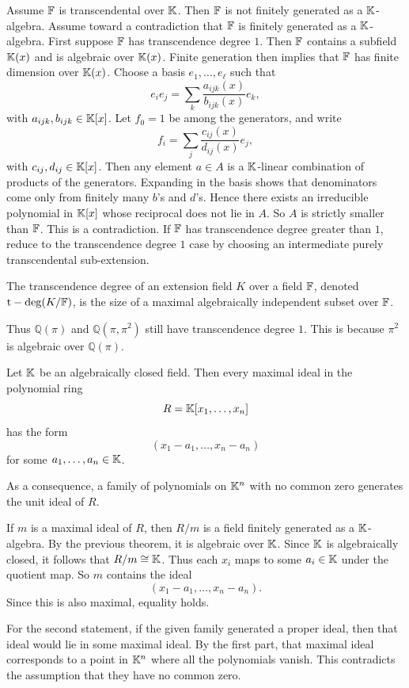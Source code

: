 \begin{theorem}{
    Assume $\mathbb{F}$ is transcendental over $\mathbb{K}$.
    Then $\mathbb{F}$ is not finitely generated as a $\mathbb{K}$-algebra.
}
Assume toward a contradiction that $\mathbb{F}$ is finitely generated as a $\mathbb{K}$-algebra.
First suppose $\mathbb{F}$ has transcendence degree $1$.
Then $\mathbb{F}$ contains a subfield $\mathbb{K}(x)$ and is algebraic over $\mathbb{K}(x)$.
Finite generation then implies that $\mathbb{F}$ has finite dimension over $\mathbb{K}(x)$.
Choose a basis $e_1,\ldots,e_\ell$ such that
\[
    e_{i}e_j = \sum_k \frac{a_{ijk}(x)}{b_{ijk}(x)}e_k,
\]
with $a_{ijk},b_{ijk}\in\mathbb{K}[x]$.
Let $f_0 = 1$ be among the generators, and write
\[
    f_i = \sum_j \frac{c_{ij}(x)}{d_{ij}(x)}e_j,
\]
with $c_{ij},d_{ij}\in\mathbb{K}[x]$.
Then any element $a\in A$ is a $\mathbb{K}$-linear combination of products of the generators.
Expanding in the basis shows that denominators come only from finitely many $b$'s and $d$'s.
Hence there exists an irreducible polynomial in $\mathbb{K}[x]$ whose reciprocal does not lie in $A$.
So $A$ is strictly smaller than $\mathbb{F}$.
This is a contradiction.
If $\mathbb{F}$ has transcendence degree greater than $1$, reduce to the transcendence degree $1$ case by choosing an intermediate purely transcendental sub-extension.
\end{theorem}

\begin{definition}
    The transcendence degree of an extension field $K$ over a field $\mathbb{F}$, denoted $\mathrm{t-deg}(K/\mathbb{F})$, is the size of a maximal algebraically independent subset over $\mathbb{F}$.
\end{definition}

Thus $\mathbb{Q}(\pi)$ and $\mathbb{Q}(\pi,\pi^2)$ still have transcendence degree $1$.
This is because $\pi^2$ is algebraic over $\mathbb{Q}(\pi)$.

\begin{theorem}{
    Let $\mathbb{K}$ be an algebraically closed field.
    Then every maximal ideal in the polynomial ring
    \[
        R = \mathbb{K}[x_1,\ldots,x_n]
    \]
    has the form
    \[
        (x_1-a_1,\ldots,x_n-a_n)
    \]
    for some $a_1,\ldots,a_n\in\mathbb{K}$.

    As a consequence, a family of polynomials on $\mathbb{K}^n$ with no common zero generates the unit ideal of $R$.
}
If $m$ is a maximal ideal of $R$, then $R/m$ is a field finitely generated as a $\mathbb{K}$-algebra.
By the previous theorem, it is algebraic over $\mathbb{K}$.
Since $\mathbb{K}$ is algebraically closed, it follows that $R/m \cong \mathbb{K}$.
Thus each $x_i$ maps to some $a_i\in\mathbb{K}$ under the quotient map.
So $m$ contains the ideal
\[
    (x_1-a_1,\ldots,x_n-a_n).
\]
Since this is also maximal, equality holds.

For the second statement, if the given family generated a proper ideal, then that ideal would lie in some maximal ideal.
By the first part, that maximal ideal corresponds to a point in $\mathbb{K}^n$ where all the polynomials vanish.
This contradicts the assumption that they have no common zero.
\end{theorem}

